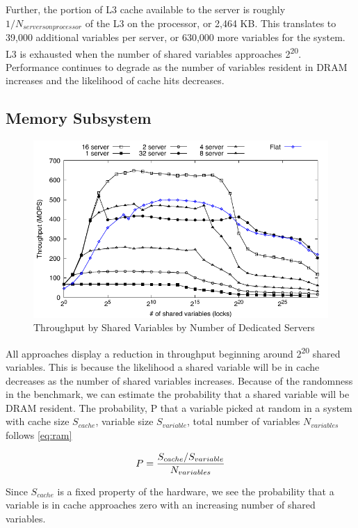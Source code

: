\documentclass{uicthesi}
\begin{document}
Further, the portion of L3 cache available to the server is roughly $1 / N_{servers on processor}$ of the L3 on the processor, or 2,464 KB. This translates to 39,000 additional variables per server, or 630,000 more variables for the system. L3 is exhausted when the number of shared variables approaches 2\textsuperscript{20}. Performance continues to degrade as the number of variables resident in DRAM increases and the likelihood of cache hits decreases. 

\subsection{Memory Subsystem}

\begin{figure}[ht!]
\centering
\includegraphics[width=0.9\columnwidth]{FIG/fetch_add_dedicated_vary_server.pdf}
\caption{Throughput by Shared Variables by Number of Dedicated Servers}
\label{fig:vary_server}
\end{figure}

All approaches display a reduction in throughput beginning around 2\textsuperscript{20} shared variables. This is because the likelihood a shared variable will be in cache decreases as the number of shared variables increases. Because of the randomness in the benchmark, we can estimate the probability that a shared variable will be DRAM resident. The probability, P  that a variable picked at random in a system with cache size $S_{cache}$, variable size $S_{variable}$, total number of variables $N_{variables}$ follows \ref{eq:ram}

\begin{equation}
P = {{S_{cache} / S_{variable}} \over N_{variables}}
\label{eq:ram}
\end{equation}

Since $S_{cache}$ is a fixed property of the hardware, we see the probability that a variable is in cache approaches zero with an increasing number of shared variables. 
\end{document}
